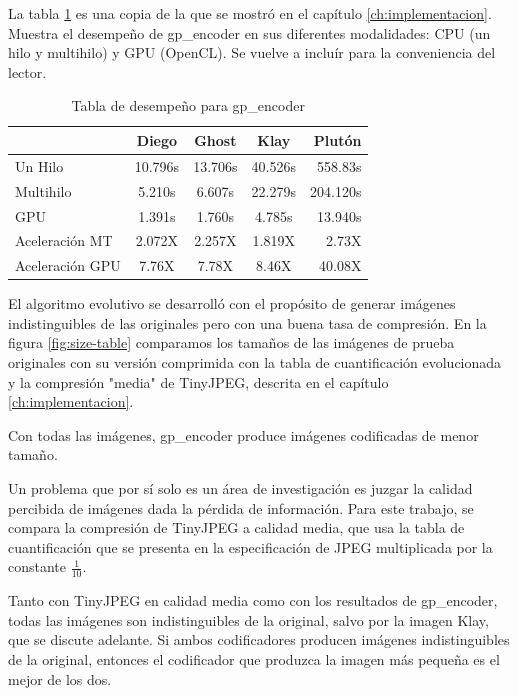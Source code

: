 La tabla \ref{table:perf_table} es una copia de la que se mostró en el capítulo
\ref{ch:implementacion}. Muestra el desempeño de gp\_encoder en sus diferentes
modalidades: CPU (un hilo y multihilo) y GPU (OpenCL). Se vuelve a incluír para
la conveniencia del lector.

\begin{table}[h!]
    \caption{Tabla de desempeño para gp\_encoder}
    \begin{tabular}{ |l c c c r | }
        \hline
                        & Diego & Ghost & Klay & Plutón \\
        \hline
        Un Hilo         & 10.796s  & 13.706s   & 40.526s &   558.83s  \\
        Multihilo       &  5.210s  & 6.607s    & 22.279s &  204.120s  \\
        GPU             &   1.391s & 1.760s   & 4.785s   &  13.940s   \\
        Aceleración MT  &  2.072X  & 2.257X  & 1.819X    &  2.73X    \\
        Aceleración GPU &   7.76X  & 7.78X  & 8.46X      &  40.08X   \\
        \hline
    \end{tabular}
    \label{table:perf_table}
\end{table}

El algoritmo evolutivo se desarrolló con el propósito de generar imágenes
indistinguibles de las originales pero con una buena tasa de compresión. En la
figura \ref{fig:size-table} comparamos los tamaños de las imágenes de prueba
originales con su versión comprimida con la tabla de cuantificación
evolucionada y la compresión "media" de TinyJPEG, descrita en el capítulo
\ref{ch:implementacion}.

Con todas las imágenes, gp\_encoder produce imágenes codificadas de menor
tamaño.

Un problema que por sí solo es un área de investigación \cite{subjective-paper}
es juzgar la calidad percibida de imágenes dada la pérdida de información. Para
este trabajo, se compara la compresión de TinyJPEG a calidad media, que usa la
tabla de cuantificación que se presenta en la especificación de JPEG
multiplicada por la constante $\frac{1}{10}$.

Tanto con TinyJPEG en calidad media como con los resultados de gp\_encoder,
todas las imágenes son indistinguibles de la original, salvo por la imagen
Klay, que se discute adelante. Si ambos codificadores producen imágenes
indistinguibles de la original, entonces el codificador que produzca la imagen más
pequeña es el mejor de los dos.

